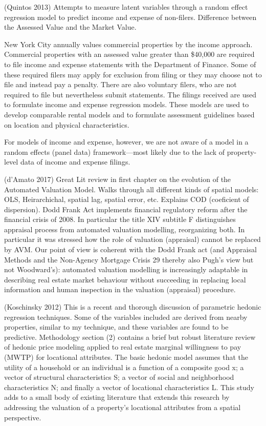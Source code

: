 \documentclass[]{article}
\begin{document}
(Quintos 2013) Attempts to measure latent variables through a random
effect regression model to predict income and expense of non-filers.
Difference between the Assessed Value and the Market Value.

New York City annually values commercial properties by the income
approach. Commercial properties with an assessed value greater than
\$40,000 are required to file income and expense statements with the
Department of Finance. Some of these required filers may apply for
exclusion from filing or they may choose not to file and instead pay a
penalty. There are also voluntary filers, who are not required to file
but nevertheless submit statements. The filings received are used to
formulate income and expense regression models. These models are used to
develop comparable rental models and to formulate assessment guidelines
based on location and physical characteristics.

For models of income and expense, however, we are not aware of a model
in a random effects (panel data) framework---most likely due to the lack
of property-level data of income and expense filings.

(d'Amato 2017) Great Lit review in first chapter on the evolution of the
Automated Valuation Model. Walks through all different kinds of spatial
models: OLS, Heirarchichal, spatial lag, spatial error, etc. Explains
COD (coeficient of dispersion). Dodd Frank Act implements financial
regulatory reform after the financial crisis of 2008. In particular the
title XIV subtitle F distinguishes appraisal process from automated
valuation modelling, reorganizing both. In particular it was stressed
how the role of valuation (appraisal) cannot be replaced by AVM. Our
point of view is coherent with the Dodd Frank act (and Appraisal Methods
and the Non-Agency Mortgage Crisis 29 thereby also Pugh's view but not
Woodward's): automated valuation modelling is increasingly adaptable in
describing real estate market behaviour without succeeding in replacing
local information and human inspection in the valuation (appraisal)
procedure.

(Koschinsky 2012) This is a recent and thorough discussion of parametric
hedonic regression techniques. Some of the variables included are
derived from nearby properties, similar to my technique, and these
variables are found to be predictive. Methodology section (2) contains a
brief but robust literature review of hedonic price modeling applied to
real estate marginal willingness to pay (MWTP) for locational
attributes. The basic hedonic model assumes that the utility of a
household or an individual is a function of a composite good x; a vector
of structural characteristics S; a vector of social and neighborhood
characteristics N; and finally a vector of locational characteristics L.
This study adds to a small body of existing literature that extends this
research by addressing the valuation of a property's locational
attributes from a spatial perspective.
\end{document}

